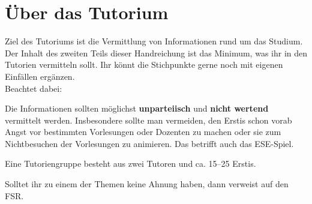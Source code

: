 \documentclass[a4paper,12pt]{report}
\begin{document}
\section{Über das Tutorium}
Ziel des Tutoriums ist die Vermittlung von Informationen rund um das Studium. Der Inhalt des zweiten Teils dieser Handreichung ist das Minimum, was ihr in den Tutorien vermitteln sollt. Ihr könnt die Stichpunkte gerne noch mit eigenen Einfällen ergänzen.\\
Beachtet dabei:
\begin{itemize*}
\item Die Informationen sollten möglichst \textbf{unparteiisch} und \textbf{nicht wertend} vermittelt werden.
Insbesondere sollte man vermeiden, den Erstis schon vorab Angst vor bestimmten Vorlesungen oder Dozenten zu machen oder sie zum Nichtbesuchen der Vorlesungen zu animieren. Das betrifft auch das ESE-Spiel.
\item Eine Tutoriengruppe besteht aus zwei Tutoren und ca. 15--25 Erstis.
\item Solltet ihr zu einem der Themen keine Ahnung haben, dann verweist auf den FSR\@.
\end{itemize*}
\end{document}
